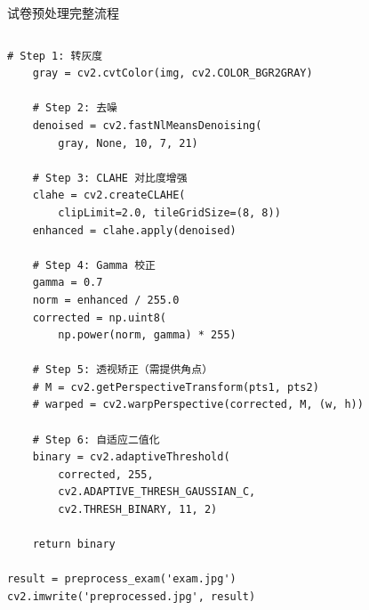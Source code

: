 \begin{frame}[fragile]{试卷预处理完整流程}
\begin{columns}[t]
\begin{lstlisting}[basicstyle=\ttfamily\tiny]
    # Step 1: 转灰度
    gray = cv2.cvtColor(img, cv2.COLOR_BGR2GRAY)

    # Step 2: 去噪
    denoised = cv2.fastNlMeansDenoising(
        gray, None, 10, 7, 21)

    # Step 3: CLAHE 对比度增强
    clahe = cv2.createCLAHE(
        clipLimit=2.0, tileGridSize=(8, 8))
    enhanced = clahe.apply(denoised)

    # Step 4: Gamma 校正
    gamma = 0.7
    norm = enhanced / 255.0
    corrected = np.uint8(
        np.power(norm, gamma) * 255)

    # Step 5: 透视矫正（需提供角点）
    # M = cv2.getPerspectiveTransform(pts1, pts2)
    # warped = cv2.warpPerspective(corrected, M, (w, h))

    # Step 6: 自适应二值化
    binary = cv2.adaptiveThreshold(
        corrected, 255,
        cv2.ADAPTIVE_THRESH_GAUSSIAN_C,
        cv2.THRESH_BINARY, 11, 2)

    return binary

result = preprocess_exam('exam.jpg')
cv2.imwrite('preprocessed.jpg', result)
        \end{lstlisting}
    \end{columns}
\end{frame}

